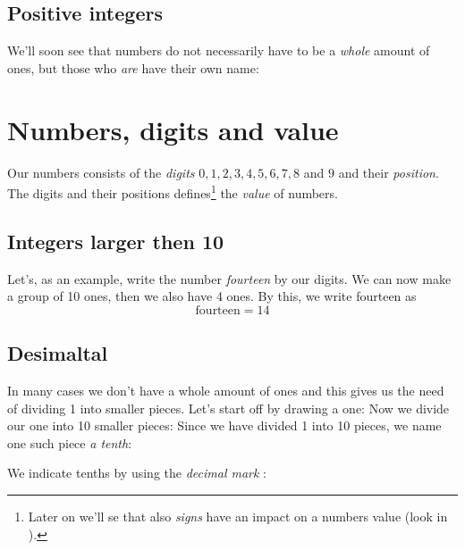 \subsection*{Positive integers}
We'll soon see that numbers do not necessarily have to be a \textsl{whole} amount of ones, but those who \textsl{are} have their own name:\regv


\newpage
\section{Numbers, digits and value}
Our numbers consists of the \textit{digits} $ 0, 1, 2 , 3, 4, 5, 6, 7, 8 $ and $ 9 $ and their \textsl{position}. The digits and their positions defines\footnote{Later on we'll se that also \textit{signs} have an impact on a numbers value  (look in ).} the \textit{value}  of numbers.
\subsection*{Integers larger then 10}
Let's, as an example, write the number \textsl{fourteen} by our digits.
We can now make a group of 10 ones, then we also have 4 ones. By this, we write fourteen as
\[ \text{fourteen}=14 \]
\vsk

\newpage
\subsection*{Desimaltal}
In many cases we don't have a whole amount of ones and this gives us the need of dividing 1 into smaller pieces. Let's start off by drawing a one:
Now we divide our one into 10 smaller pieces:
Since we have divided 1 into 10 pieces, we name one such piece \textit{a tenth}:
\begin{comment}
\eks{\vs
	\fig{maal2}
	\fig{des2}
}\vsk
\end{comment}
We indicate tenths by using the \textit{decimal mark}   :
\regv
{}
\newpage
